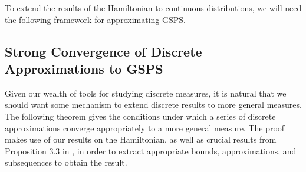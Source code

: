 \documentclass[11pt]{article}
\numberwithin{equation}{section}
\begin{document}
        To extend the results of the Hamiltonian to continuous distributions, we will need the following framework for approximating GSPS. 
    \subsection{Strong Convergence of Discrete Approximations to GSPS}
        Given our wealth of tools for studying discrete measures, it is natural that we should want some mechanism to extend discrete results to more general measures.
        The following theorem gives the conditions under which a series of discrete approximations converge appropriately to a more general measure. The proof makes use of our results on the Hamiltonian, as well as crucial results from Proposition 3.3 in \cite{Tudorascu-2008}, in order to extract appropriate bounds, approximations, and subsequences to obtain the result. 
    
\end{document}
